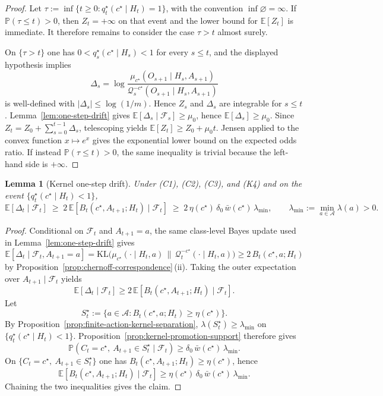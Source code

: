 \documentclass[11pt]{article}
\newtheorem{lemma}[theorem]{Lemma}
\theoremstyle{definition}
\theoremstyle{remark}
\newcommand{\Acal}{\mathcal{A}}
\newcommand{\Qcal}{\mathcal{Q}}
\newcommand{\E}{\mathbb{E}}
\newcommand{\Prob}{\mathbb{P}}
\newcommand{\KL}{\mathrm{KL}}
\begin{document}
\begin{proof}
Let $\tau:=\inf\{t\ge 0:q_t^\star(c^\star\mid H_t)=1\}$, with the convention $\inf\varnothing=\infty$. If $\Prob(\tau\le t)>0$, then $Z_t=+\infty$ on that event and the lower bound for $\E[Z_t]$ is immediate. It therefore remains to consider the case $\tau>t$ almost surely.

On $\{\tau>t\}$ one has $0<q_s^\star(c^\star\mid H_s)<1$ for every $s\le t$, and the displayed hypothesis implies
\[
\Delta_s=\log\frac{\mu_{c^\star}(O_{s+1}\mid H_s,A_{s+1})}{\Qcal_s^{-c^\star}(O_{s+1}\mid H_s,A_{s+1})}
\]
is well-defined with $|\Delta_s|\le \log(1/m)$. Hence $Z_s$ and $\Delta_s$ are integrable for $s\le t$. Lemma~\ref{lem:one-step-drift} gives $\E[\Delta_s\mid\mathcal F_s]\ge\mu_0$, hence $\E[\Delta_s]\ge\mu_0$. Since $Z_t=Z_0+\sum_{s=0}^{t-1}\Delta_s$, telescoping yields $\E[Z_t]\ge Z_0+\mu_0 t$. Jensen applied to the convex function $x\mapsto e^x$ gives the exponential lower bound on the expected odds ratio. If instead $\Prob(\tau\le t)>0$, the same inequality is trivial because the left-hand side is $+\infty$.
\end{proof}

\begin{lemma}[Kernel one-step drift]
\label{lem:one-step-drift-kernel}
Under \textup{(C1)}, \textup{(C2)}, \textup{(C3)}, and \textup{(K4)} and on the event $\{q_t^\star(c^\star\mid H_t)<1\}$,
\[
\E[\Delta_t\mid\mathcal F_t]
\;\ge\;
2\,\E[B_t(c^\star,A_{t+1};H_t)\mid\mathcal F_t]
\;\ge\;
2\,\eta(c^\star)\,\delta_0\,\bar w(c^\star)\,\lambda_{\min},
\qquad
\lambda_{\min}:=\min_{a\in\Acal}\lambda(a)>0.
\]
\end{lemma}

\begin{proof}
Conditional on $\mathcal F_t$ and $A_{t+1}=a$, the same class-level Bayes update used in Lemma~\ref{lem:one-step-drift} gives
\[
\E[\Delta_t\mid\mathcal F_t,A_{t+1}=a]
=
\KL\!\bigl(\mu_{c^\star}(\cdot\mid H_t,a)\,\|\,\Qcal_t^{-c^\star}(\cdot\mid H_t,a)\bigr)
\ge 2\,B_t(c^\star,a;H_t)
\]
by Proposition~\ref{prop:chernoff-correspondence}\,(ii). Taking the outer expectation over $A_{t+1}\mid\mathcal F_t$ yields
\[
\E[\Delta_t\mid\mathcal F_t]\ge 2\,\E[B_t(c^\star,A_{t+1};H_t)\mid\mathcal F_t].
\]
Let
\[
S_t^\star:=\{a\in\Acal:B_t(c^\star,a;H_t)\ge \eta(c^\star)\}.
\]
By Proposition~\ref{prop:finite-action-kernel-separation}, $\lambda(S_t^\star)\ge \lambda_{\min}$ on $\{q_t^\star(c^\star\mid H_t)<1\}$. Proposition~\ref{prop:kernel-promotion-support} therefore gives
\[
\Prob(C_t=c^\star,\ A_{t+1}\in S_t^\star\mid\mathcal F_t)\ge \delta_0\,\bar w(c^\star)\,\lambda_{\min}.
\]
On $\{C_t=c^\star,\ A_{t+1}\in S_t^\star\}$ one has $B_t(c^\star,A_{t+1};H_t)\ge \eta(c^\star)$, hence
\[
\E[B_t(c^\star,A_{t+1};H_t)\mid\mathcal F_t]
\ge
\eta(c^\star)\,\delta_0\,\bar w(c^\star)\,\lambda_{\min}.
\]
Chaining the two inequalities gives the claim.
\end{proof}
\end{document}
